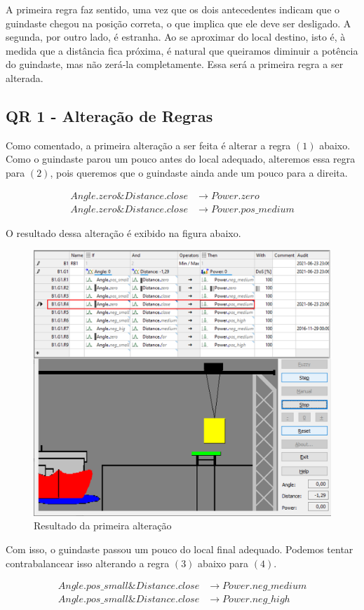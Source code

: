 \documentclass[12pt]{article}
\begin{document}
A primeira regra faz sentido, uma vez que os dois antecedentes indicam que o guindaste chegou na posição correta, o que implica que ele deve ser desligado. A segunda, por outro lado, é estranha. Ao se aproximar do local destino, isto é, à medida que a distância fica próxima, é natural que queiramos diminuir a potência do guindaste, mas não zerá-la completamente. Essa será a primeira regra a ser alterada.

\subsection{QR 1 - Alteração de Regras}

Como comentado, a primeira alteração a ser feita é alterar a regra $(1)$ abaixo. Como o guindaste parou um pouco antes do local adequado, alteremos essa regra para $(2)$, pois queremos que o guindaste ainda ande um pouco para a direita.

\begin{align}
	Angle.zero\&Distance.close&\to Power.zero\\
	Angle.zero\&Distance.close&\to Power.pos\_medium
\end{align}

O resultado dessa alteração é exibido na figura abaixo.
\begin{figure}[H]
	\centering
	\includegraphics[width=0.7\linewidth]{Imagens/QR1/alteracao1}
	\caption{Resultado da primeira alteração}
	\label{fig:alteracao1}
\end{figure}

Com isso, o guindaste passou um pouco do local final adequado. Podemos tentar contrabalancear isso alterando a regra $(3)$ abaixo para $(4)$. 

\begin{align}
	Angle.pos\_small\&Distance.close&\to Power.neg\_medium\\
	Angle.pos\_small\&Distance.close&\to Power.neg\_high
\end{align}
\end{document}

